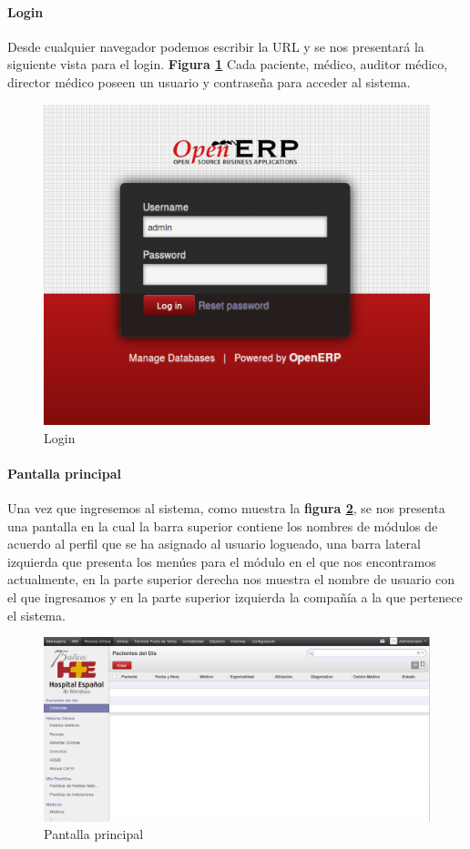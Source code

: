 \paragraph{Login}

Desde cualquier navegador podemos escribir la URL y se nos presentará la siguiente vista para el login. \textbf{Figura \ref{login-sistema}}
Cada paciente, médico, auditor médico, director médico poseen un usuario y contraseña para acceder al sistema.

\begin{figure}[h]
      \centering
      \includegraphics[width=.8\textwidth]{img/tp1/HE/Login}
      \caption{Login}
      \label{login-sistema}
\end{figure} 


\paragraph{Pantalla principal}

Una vez que ingresemos al sistema, como muestra la \textbf{figura \ref{pantalla-princip}}, se nos presenta una pantalla en la cual la barra superior contiene los nombres de módulos de acuerdo al perfil que se ha asignado al usuario logueado, una barra lateral izquierda que presenta los menúes para el módulo en el que nos encontramos actualmente, en la parte superior derecha nos muestra el nombre de usuario con el que ingresamos y en la parte superior izquierda la compañía a la que pertenece el sistema.


\begin{figure}[h]
      \centering
      \includegraphics[width=.8\textwidth]{img/tp1/HE/PantallaPrincip}
      \caption{Pantalla principal}
      \label{pantalla-princip}
\end{figure}


